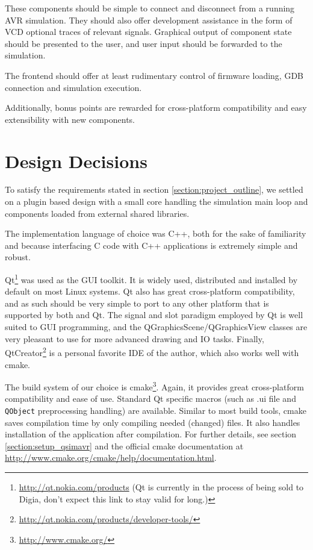 These components should be simple to connect and disconnect from a running \ac{AVR}
simulation. They should also offer development assistance in the form of \ac{VCD}
optional traces of relevant signals. Graphical output of component state should
be presented to the user, and user input should be forwarded to the simulation.

The frontend should offer at least rudimentary control of firmware
loading, \ac{GDB} connection and simulation execution.

Additionally, bonus points are rewarded for cross-platform compatibility and
easy extensibility with new components.

\section{Design Decisions} \label{section:design_principles}

To satisfy the requirements stated in section \ref{section:project_outline},
we settled on a plugin based design with a small core handling the simulation main
loop and components loaded from external shared libraries.

The implementation language of choice was C++, both for the sake of familiarity
and because interfacing C code with C++ applications is extremely simple and
robust.

Qt\footnote{
%
\url{http://qt.nokia.com/products} (Qt is currently in the process of being sold
to Digia, don't expect this link to stay valid for long.)
%
} was used as the \ac{GUI} toolkit. It is widely used, distributed and installed
by default on most Linux systems. Qt also has great cross-platform compatibility,
and as such \qsimavr should be very simple to port to any other platform that
is supported by both \simavr and Qt. The signal and slot paradigm employed by
Qt is well suited to \ac{GUI} programming, and the
QGraphicsScene/QGraphicsView classes are very pleasant to use for more advanced
drawing and \ac{IO} tasks. Finally, QtCreator\footnote{
%
\url{http://qt.nokia.com/products/developer-tools/}
%
} is a personal favorite \ac{IDE} of
the author, which also works well with cmake.

The build system of our choice is cmake\footnote{\url{http://www.cmake.org/}}.
Again, it provides great cross-platform
compatibility and ease of use. Standard Qt specific macros (such as .ui file and
\lstinline|QObject| preprocessing handling) are available. Similar to most build tools, cmake
saves compilation time by only compiling needed (changed) files. It also handles
installation of the application after compilation. For further details, see
section \ref{section:setup_qsimavr} and the official cmake documentation at
\url{http://www.cmake.org/cmake/help/documentation.html}.


